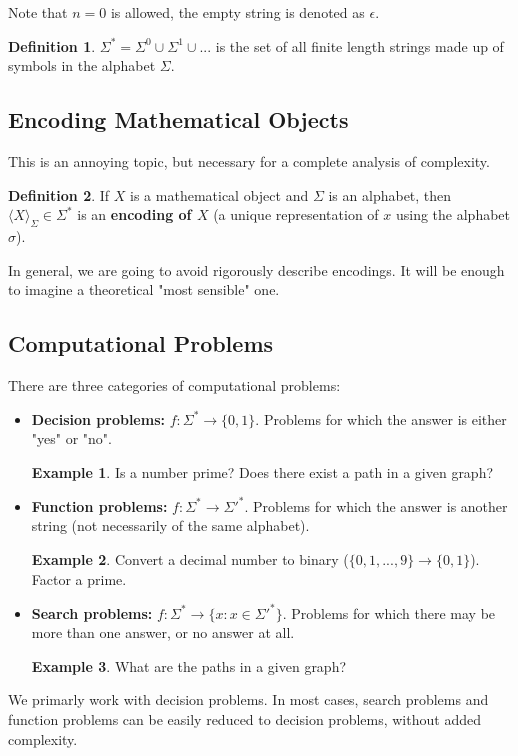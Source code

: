 \documentclass[11pt]{article}
\theoremstyle{plain}
\theoremstyle{definition}
\newtheorem*{defn}{Definition}
\newtheorem*{ex}{Example}
\begin{document}
Note that $n = 0$ is allowed, the empty string is denoted as $\epsilon$.

\begin{defn}
    $\Sigma^* = \Sigma^0 \cup \Sigma^1 \cup ...$ is the set of all finite length strings made up of
    symbols in the alphabet $\Sigma$.
\end{defn}

\subsection{Encoding Mathematical Objects}

This is an annoying topic, but necessary for a complete analysis of complexity. 

\begin{defn}
    If $X$ is a mathematical object and $\Sigma$ is an alphabet, then $\langle X \rangle_\Sigma \in
    \Sigma^*$ is an {\bf encoding of $X$} (a unique representation of $x$ using the alphabet $\sigma$).
\end{defn}

In general, we are going to avoid rigorously describe encodings. It will be enough to imagine a 
theoretical "most sensible" one.

\subsection{Computational Problems}

There are three categories of computational problems:

\begin{itemize}
    \item {\bf Decision problems:} $f: \Sigma^* \to \{0, 1\}$. Problems for which the answer is 
        either "yes" or "no".
    
        \begin{ex}
            Is a number prime? Does there exist a path in a given graph?
        \end{ex}

    \item {\bf Function problems:} $f: \Sigma^* \to \Sigma'^*$. Problems for which the answer is 
        another string (not necessarily of the same alphabet).

        \begin{ex}
            Convert a decimal number to binary ($\{0, 1, ..., 9\} \to \{0, 1\}$). 
            Factor a prime.
        \end{ex}

    \item {\bf Search problems:} $f: \Sigma^* \to \{x : x \in \Sigma'^*\}$. 
        Problems for which there may be more than one answer, or no answer at all.

        \begin{ex}
            What are the paths in a given graph?
        \end{ex}
\end{itemize}

We primarly work with decision problems. In most cases, search problems and function problems can be
easily reduced to decision problems, without added complexity.
\end{document}
